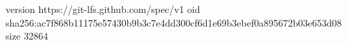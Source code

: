 version https://git-lfs.github.com/spec/v1
oid sha256:ac7f868b11175e57430b9b3c7e4dd300cf6d1e69b3ebef0a895672b03e653d08
size 32864

